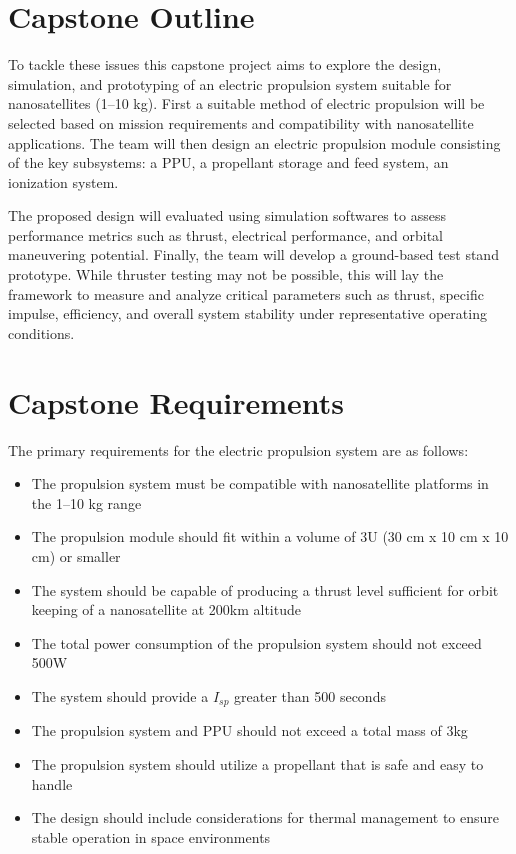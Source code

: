 \section{Capstone Outline}
To tackle these issues this capstone project aims to explore the design, simulation, and prototyping of an electric propulsion system suitable for nanosatellites (1–10 kg). First a suitable method of electric propulsion will be selected based on mission requirements and compatibility with nanosatellite applications. The team will then design an electric propulsion module consisting of the key subsystems: a \ac{PPU}, a propellant storage and feed system, an ionization system.

The proposed design will evaluated using simulation softwares to assess performance metrics such as thrust, electrical performance, and orbital maneuvering potential. Finally, the team will develop a ground-based test stand prototype. While thruster testing may not be possible, this will lay the framework to measure and analyze critical parameters such as thrust, specific impulse, efficiency, and overall system stability under representative operating conditions.

\section{Capstone Requirements}
The primary requirements for the electric propulsion system are as follows:
\begin{itemize}
    \item The propulsion system must be compatible with nanosatellite platforms in the 1–10 kg range
    \item The propulsion module should fit within a volume of 3U (30 cm x 10 cm x 10 cm) or smaller
    \item The system should be capable of producing a thrust level sufficient for orbit keeping of a nanosatellite at 200km altitude
    \item The total power consumption of the propulsion system should not exceed 500W
    \item The system should provide a $I_{sp}$ greater than 500 seconds
    \item The propulsion system and \ac{PPU} should not exceed a total mass of 3kg
    \item The propulsion system should utilize a propellant that is safe and easy to handle
    \item The design should include considerations for thermal management to ensure stable operation in space environments
\end{itemize}

